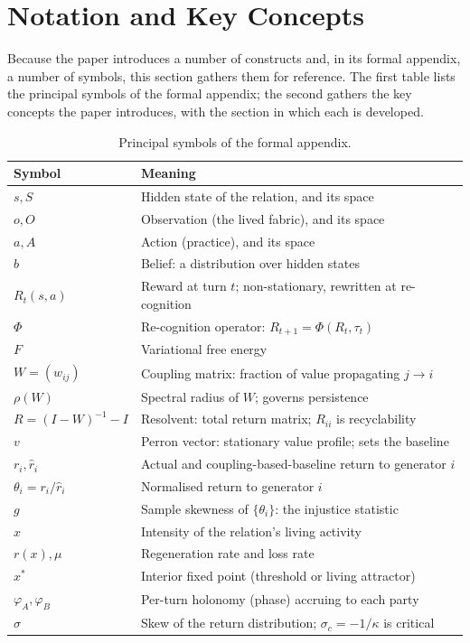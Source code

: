 \section{Notation and Key Concepts}
\label{p11:sec:notation}

\noindent
Because the paper introduces a number of constructs and, in its formal appendix, a number of symbols, this section gathers them for reference. The first table lists the principal symbols of the formal appendix; the second gathers the key concepts the paper introduces, with the section in which each is developed.

\begin{table}[h]
\centering
\small
\renewcommand{\arraystretch}{1.25}
\caption{Principal symbols of the formal appendix.}
\label{p11:tab:notation}
\begin{tabularx}{\linewidth}{@{}>{\raggedright\arraybackslash}p{2.2cm} >{\raggedright\arraybackslash}X@{}}
\toprule
\rowcolor{pageblush}
\textbf{\textcolor{rosedeep}{Symbol}} & \textbf{\textcolor{rosedeep}{Meaning}} \\
\midrule
$s, S$ & Hidden state of the relation, and its space \\
$o, O$ & Observation (the lived fabric), and its space \\
$a, A$ & Action (practice), and its space \\
$b$ & Belief: a distribution over hidden states \\
$R_t(s,a)$ & Reward at turn $t$; non-stationary, rewritten at re-cognition \\
$\Phi$ & Re-cognition operator: $R_{t+1} = \Phi(R_t, \tau_t)$ \\
$F$ & Variational free energy \\
$W = (w_{ij})$ & Coupling matrix: fraction of value propagating $j \to i$ \\
$\rho(W)$ & Spectral radius of $W$; governs persistence \\
$R = (I-W)^{-1} - I$ & Resolvent: total return matrix; $R_{ii}$ is recyclability \\
$v$ & Perron vector: stationary value profile; sets the baseline \\
$r_i, \hat{r}_i$ & Actual and coupling-based-baseline return to generator $i$ \\
$\theta_i = r_i/\hat{r}_i$ & Normalised return to generator $i$ \\
$g$ & Sample skewness of $\{\theta_i\}$: the injustice statistic \\
$x$ & Intensity of the relation's living activity \\
$r(x), \mu$ & Regeneration rate and loss rate \\
$x^*$ & Interior fixed point (threshold or living attractor) \\
$\varphi_A, \varphi_B$ & Per-turn holonomy (phase) accruing to each party \\
$\sigma$ & Skew of the return distribution; $\sigma_c = -1/\kappa$ is critical \\
\bottomrule
\end{tabularx}
\end{table}

